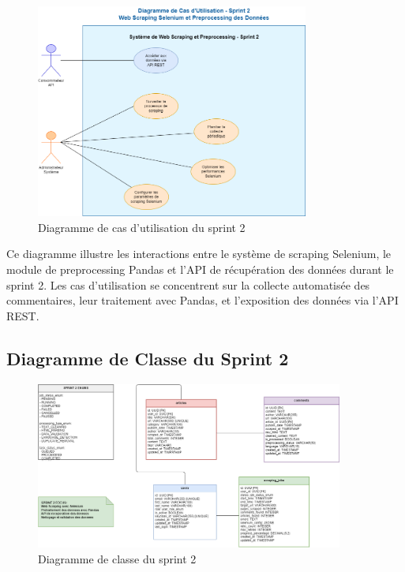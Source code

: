 \begin{figure}[H]
\centering
\includegraphics[width=0.8\textwidth]{assets/images/sprint2-usecase.png}
\caption{Diagramme de cas d'utilisation du sprint 2}
\label{fig:sprint2-usecase}
\end{figure}

Ce diagramme illustre les interactions entre le système de scraping Selenium, le module de preprocessing Pandas et l'API de récupération des données durant le sprint 2. Les cas d'utilisation se concentrent sur la collecte automatisée des commentaires, leur traitement avec Pandas, et l'exposition des données via l'API REST.

\subsection{Diagramme de Classe du Sprint 2}

\begin{figure}[H]
\centering
\includegraphics[width=0.9\textwidth]{assets/images/sprint2-class.png}
\caption{Diagramme de classe du sprint 2}
\label{fig:sprint2-class}
\end{figure}

